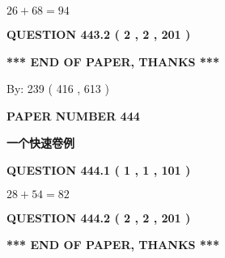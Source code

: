 \documentclass{ctexart}
\begin{document}
  
 
 

$ %
26 +  %
68=   %
94$
 
 
  
\vspace{0.2in}
  
{\textbf{\Large{QUESTION
443.2 
 ( 2 , 2 , 201 )
}}}
  
  
   
   
 \vspace{0.2in}
 
   
   
   
   
\vspace{1.0in} 
{\textbf{\large{ *** END OF PAPER, THANKS *** }}} 
   
   
\hspace{1.0in} By: 
 239 ( 416 ,  613 )
   
   
   
   
\newpage 
\setcounter{page}{ 
   444001 } 
   
   
   
   
 {\textbf{ \Large{ PAPER NUMBER  444  }}}
   
   
\vspace{0.2in}
   
   
   
   
   
   
 \vspace{0.2in}
{\LARGE {\textbf{ 一个快速卷例}}}
   
   
  
\vspace{0.2in}
  
{\textbf{\Large{QUESTION
444.1 
 ( 1 , 1 , 101 )
}}}
  
  
 
 

$ %
28 +  %
54=   %
82$
 
 
  
\vspace{0.2in}
  
{\textbf{\Large{QUESTION
444.2 
 ( 2 , 2 , 201 )
}}}
  
  
   
   
 \vspace{0.2in}
 
   
   
   
   
\vspace{1.0in} 
{\textbf{\large{ *** END OF PAPER, THANKS *** }}} 
   
\end{document}
